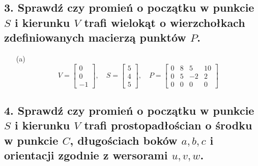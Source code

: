 \subsection*{3. Sprawdź czy promień o początku w punkcie \( S \) i kierunku \( V \) trafi wielokąt o wierzchołkach zdefiniowanych macierzą punktów \( P \).}

\begin{enumerate}
    \item[(a)] 
    \[
    V = \begin{bmatrix} 0 \\ 0 \\ -1 \end{bmatrix}, 
    \quad S = \begin{bmatrix} 5 \\ 4 \\ 5 \end{bmatrix}, 
    \quad P = \begin{bmatrix} 
    0 & 8 & 5 & 10 \\ 
    0 & 5 & -2 & 2 \\ 
    0 & 0 & 0 & 0 
    \end{bmatrix}
    \]
\end{enumerate}


\subsection*{4. Sprawdź czy promień o początku w punkcie \( S \) i kierunku \( V \) trafi prostopadłościan o środku w punkcie \( C \), długościach boków \( a, b, c \) i orientacji zgodnie z wersorami \( u, v, w \).}

